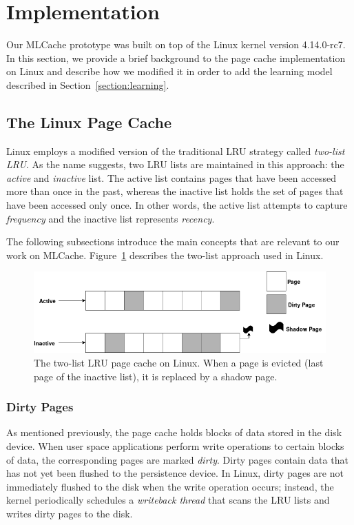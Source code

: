 \section{Implementation}

Our MLCache prototype was built on top of the Linux kernel version 4.14.0-rc7.
In this section, we provide a brief background to the page cache implementation
on Linux and describe how we modified it in order to add the learning model
described in Section~\ref{section:learning}.

\subsection{The Linux Page Cache}

Linux employs a modified version of the traditional LRU strategy called
\emph{two-list LRU}. As the name suggests, two LRU lists are maintained in this
approach: the \emph{active} and \emph{inactive} list. The active list contains
pages that have been accessed more than once in the past, whereas the inactive
list holds the set of pages that have been accessed only once. In other words,
the active list attempts to capture \emph{frequency} and the inactive list
represents \emph{recency}.

The following subsections introduce the main concepts that are relevant to our
work on MLCache. Figure~\ref{fig:lru} describes the two-list approach used in Linux.

\begin{figure}[h]
  \includegraphics[scale=0.3]{img/LinuxLRU.png}
  \caption{The two-list LRU page cache on Linux. When a page is evicted (last
  page of the inactive list), it is replaced by a shadow page.}
  \label{fig:lru}
\end{figure}

\subsubsection{Dirty Pages}

As mentioned previously, the page cache holds blocks of data stored in the disk
device.  When user space applications perform write operations to certain
blocks of data, the corresponding pages are marked \emph{dirty}. Dirty pages
contain data that has not yet been flushed to the persistence device. In Linux,
dirty pages are not immediately flushed to the disk when the write operation
occurs; instead, the kernel periodically schedules a \emph{ writeback thread}
that scans the LRU lists and writes dirty pages to the disk.

